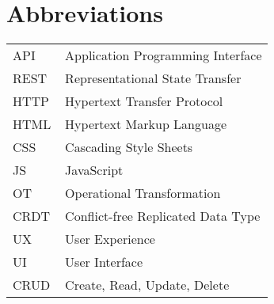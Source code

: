 \chapter*{Abbreviations}


\begin{flushleft}
\begin{tabular}{l p{0.8\linewidth}}
API      & Application Programming Interface\\
REST     & Representational State Transfer\\
HTTP     & Hypertext Transfer Protocol\\
HTML     & Hypertext Markup Language\\
CSS      & Cascading Style Sheets\\
JS       & JavaScript\\
OT       & Operational Transformation\\
CRDT     & Conflict-free Replicated Data Type\\
UX       & User Experience\\
UI       & User Interface\\
CRUD     & Create, Read, Update, Delete\\
\end{tabular}
\end{flushleft}

